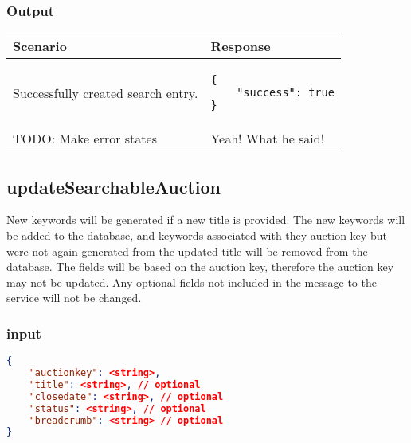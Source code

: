 \documentclass[12pt,a4paper]{article}
\begin{document}
\subsubsection{Output}
\begin{center}
    \begin{tabular}{| p{5cm} | l |}
        \hline
        \textbf{Scenario} & \textbf{Response} \\
        \hline
        Successfully created search entry. & 
        \begin{lstlisting}[boxpos=t,language=tableJson,firstnumber=1]
{
    "success": true
}
        \end{lstlisting} \\ 
        \hline
            TODO: Make error states & Yeah! What he said! \\
        \hline
    \end{tabular}
\end{center}


\subsection{updateSearchableAuction}
\label{ref:usa}
New keywords will be generated if a new title is provided. The new keywords will be added to the database, and keywords
associated with they auction key but were not again generated from the updated
title will be removed from the database. The fields will be based on the
auction key, therefore the auction key may not be updated. Any optional fields
not included in the message to the service will not be changed.

\subsubsection{input}
\begin{lstlisting}[language=json,firstnumber=1]
{
    "auctionkey": <string>,
    "title": <string>, // optional
    "closedate": <string>, // optional
    "status": <string>, // optional
    "breadcrumb": <string> // optional
}
\end{lstlisting}
\end{document}

